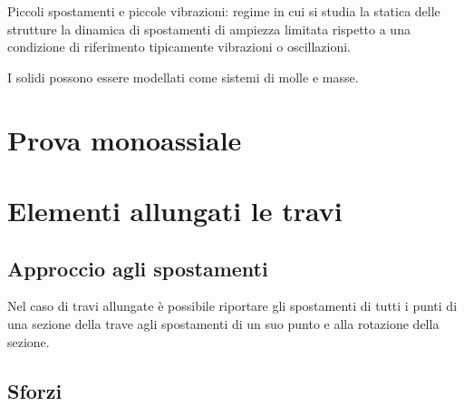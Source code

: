 \documentclass[letterpaper,10pt,italian]{jupyterBook}
\begin{document}
\sphinxAtStartPar
Piccoli spostamenti e piccole vibrazioni: regime in cui si studia la statica delle strutture la dinamica di spostamenti di ampiezza limitata rispetto a una condizione di riferimento \sphinxhyphen{} tipicamente vibrazioni o oscillazioni.  

\sphinxAtStartPar
I solidi  \sphinxhyphen{}  \sphinxhyphen{} possono essere modellati come sistemi di molle e masse.  


\section{Prova mono\sphinxhyphen{}assiale}
\label{\detokenize{ch/continuum/solids:prova-mono-assiale}}\label{\detokenize{ch/continuum/solids:contiuum-solids-mono-axial}}

\section{Elementi allungati \sphinxhyphen{} le travi}
\label{\detokenize{ch/continuum/solids:elementi-allungati-le-travi}}\label{\detokenize{ch/continuum/solids:contiuum-solids-beam}}

\subsection{Approccio agli spostamenti}
\label{\detokenize{ch/continuum/solids:approccio-agli-spostamenti}}\label{\detokenize{ch/continuum/solids:contiuum-solids-beam-displacement}}
\sphinxAtStartPar
Nel caso di travi allungate è possibile riportare gli spostamenti di tutti i punti di una sezione della trave agli spostamenti di un suo punto e alla rotazione della sezione.


\subsection{Sforzi}
\label{\detokenize{ch/continuum/solids:sforzi}}\label{\detokenize{ch/continuum/solids:contiuum-solids-beam-stress}}
\end{document}
